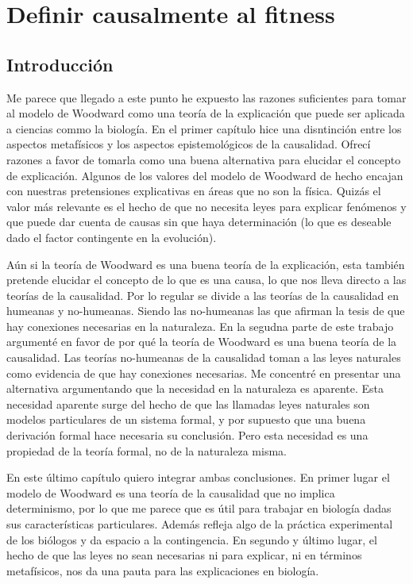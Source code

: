 \chapter{Definir causalmente al fitness}

\section{Introducción}

Me parece que llegado a este punto he expuesto las razones suficientes para tomar al modelo de  Woodward como una teoría de la explicación que puede ser aplicada a ciencias commo la biología. En el primer capítulo hice una disntinción entre los aspectos metafísicos y los aspectos epistemológicos de la causalidad.  Ofrecí razones a  favor de tomarla como una buena alternativa para elucidar el concepto de explicación. Algunos de los valores del modelo de Woodward de hecho encajan con nuestras pretensiones explicativas en áreas que no son la física. Quizás el valor más relevante es el hecho de que no necesita leyes para explicar fenómenos y que puede dar cuenta de causas sin que haya determinación (lo que es deseable dado el factor contingente en la evolución).

Aún si la teoría de Woodward es una buena teoría de la explicación, esta también pretende elucidar el concepto de lo que es una causa, lo que nos lleva directo a las teorías de la causalidad. Por lo regular se divide a las teorías de la causalidad en humeanas y no-humeanas. Siendo las no-humeanas las que afirman la tesis de que hay conexiones necesarias en la naturaleza. En la segudna parte de este trabajo argumenté en favor de por qué la teoría de Woodward es una buena teoría de la causalidad. Las teorías no-humeanas de la causalidad toman a las leyes naturales como evidencia de que hay conexiones necesarias. Me concentré en presentar una alternativa argumentando que la necesidad en la naturaleza es aparente. Esta necesidad aparente surge del hecho de que las llamadas leyes naturales son modelos particulares de un sistema formal, y por supuesto que una buena derivación formal hace necesaria su conclusión. Pero esta necesidad es una propiedad de la teoría formal, no de la naturaleza misma.

En este último capítulo quiero integrar ambas conclusiones. En primer lugar el modelo de Woodward es una teoría de la causalidad que no implica determinismo, por lo que me parece que es útil para trabajar en biología dadas sus características particulares. Además refleja algo de la práctica experimental de los biólogos y da espacio a la contingencia. En segundo y último lugar,  el hecho de que las leyes no sean necesarias ni para explicar, ni en términos metafísicos, nos da una pauta para las explicaciones en biología.

